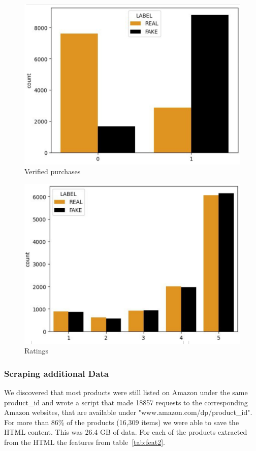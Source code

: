 \documentclass[utf8x]{ctexart}
\begin{document}
\begin{figure}[htb]
  \centering
  \includegraphics[width=0.48\linewidth]{./verified.png}
  \caption{Verified purchases}
  \label{fig:verified}
\end{figure}

\begin{figure}[htb]
  \centering
  \includegraphics[width=0.48\linewidth]{./rating.png}
  \caption{Ratings}
  \label{fig:rating}
\end{figure}

\subsubsection{Scraping additional Data}

We discovered that most products were still listed on Amazon under the same product\_id and wrote a script that made 18857 requests to the corresponding Amazon websites, that are available under "www.amazon.com/dp/product\_id". For more than 86\% of the products (16,309 items) we were able to save the HTML content. This was 26.4 GB of data. For each of the products extracted from the HTML the features from table~\ref{tab:feat2}.
\end{document}
